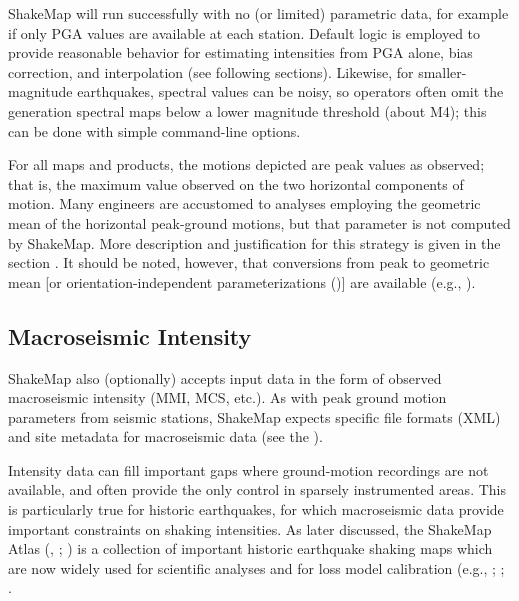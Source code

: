 \documentclass[letterpaper,10pt,english]{sphinxmanual}
\begin{document}
ShakeMap will run successfully with no (or limited) parametric data, for example if only
PGA values are available at each station. Default logic is employed to provide reasonable
behavior for estimating intensities from PGA alone, bias correction, and interpolation
(see following sections). Likewise, for smaller-magnitude earthquakes, spectral values
can be noisy, so operators often omit the generation spectral maps below a lower
magnitude threshold (about M4); this can be done with simple command-line options.

For all maps and products, the motions depicted are peak values as observed; that is, the
maximum value observed on the two horizontal components of motion.  Many engineers
are accustomed to analyses employing the geometric mean of the horizontal peak-ground
motions, but that parameter is not computed by ShakeMap. More description and justification
for this strategy is given in the section {\hyperref[tg_choice_of_parameters:peak\string-values\string-vs\string-mean]{}}. It should be noted,
however, that conversions from peak to geometric mean {[}or orientation-independent
parameterizations ({\hyperref[references:boore2010]{}}){]} are available
(e.g., {\hyperref[references:beyer2006]{}}).


\subsection{Macroseismic Intensity}
\label{tg_parameters:macroseismic-intensity}
ShakeMap also (optionally) accepts input data in the form of observed macroseismic
intensity (MMI, MCS, etc.). As with peak ground motion parameters from seismic
stations, ShakeMap expects specific file formats (XML) and site metadata for
macroseismic data (see the {\hyperref[software_guide:sm35\string-software\string-guide]{}}).

Intensity data can fill important gaps where ground-motion recordings are not available,
and often provide the only control in sparsely instrumented areas. This is particularly true
for historic earthquakes, for which macroseismic data provide important constraints on
shaking intensities. As later discussed, the ShakeMap Atlas ({\hyperref[references:allen2008]{}}, {\hyperref[references:allen2009a]{}};
{\hyperref[references:garcia2012a]{}}) is a collection of important historic earthquake shaking maps which
are now widely used for scientific analyses and for loss model calibration (e.g., {\hyperref[references:wald2008]{}}; {\hyperref[references:jaiswal2010]{}}; {\hyperref[references:pomonis2011]{}}.
\end{document}
